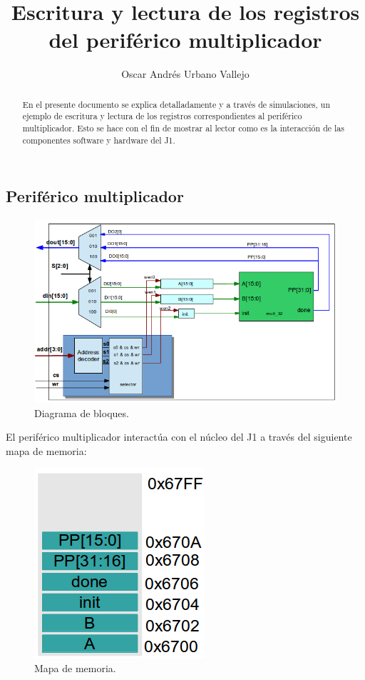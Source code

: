 \documentclass[a4paper,10pt]{article}
\title{Escritura y lectura de los registros del periférico multiplicador}
\author{Oscar Andrés Urbano Vallejo}
\begin{document}
\maketitle

\begin{abstract}
 En el presente documento se explica detalladamente y a través de simulaciones, un ejemplo de escritura y lectura de los registros correspondientes al periférico multiplicador. Esto se hace con el fin de  mostrar al lector como es la interacción de las componentes software y hardware del J1. 
\end{abstract}


\begin{center}
\section*{Periférico multiplicador}
\end{center}


\begin{figure}[H]	%
  \centering
    \includegraphics[scale=0.7]{diag_bloques_mult.png}
      \caption{Diagrama de bloques.}
	\label{fig1}
\end{figure}

El periférico multiplicador interactúa con el núcleo del J1  a través del siguiente mapa de memoria:

\begin{figure}[H]	%
  \centering
    \includegraphics[scale=0.7]{memory_map_mult.png}
      \caption{Mapa de memoria.}
	\label{fig2}
\end{figure}
\end{document}
